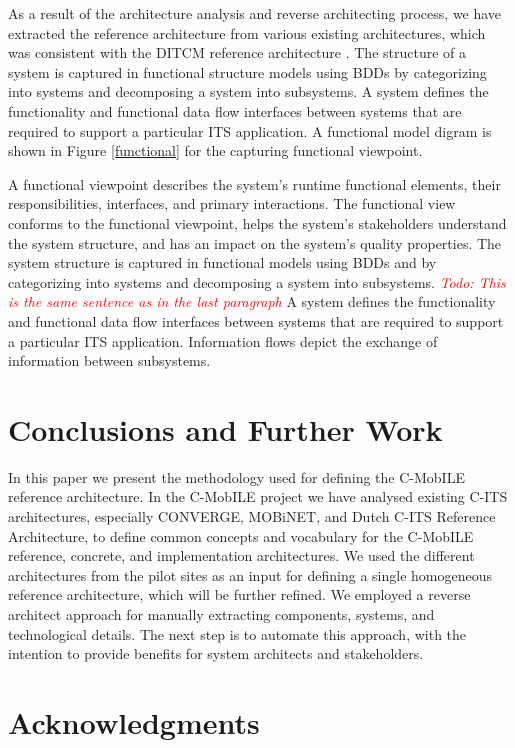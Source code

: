 \documentclass[conference]{IEEEtran}
\newcommand{\todo}[1]{\textcolor{red}{\emph{Todo: #1}}}
\begin{document}
As a result of the architecture analysis and reverse architecting process, we have extracted the reference architecture from various existing architectures, which was consistent with the DITCM reference architecture \cite{ditcm}\cite{ditcmits}.
The structure of a system is captured in functional structure models using BDDs by categorizing into systems and decomposing a system into subsystems.
A system defines the functionality and functional data flow interfaces between systems that are required to support a particular ITS application.
A functional model digram is shown in Figure \ref{functional} for the capturing functional viewpoint.



A functional viewpoint describes the system's runtime functional elements, their responsibilities, interfaces, and primary interactions.
The functional view conforms to the functional viewpoint, helps the system's stakeholders understand the system structure, and has an impact on the system's quality properties.
The system structure is captured in functional models using BDDs and by categorizing into systems and decomposing a system into subsystems. \todo{This is the same sentence as in the last paragraph}
A system defines the functionality and functional data flow interfaces between systems that are required to support a particular ITS application.
Information flows depict the exchange of information between subsystems.


\section{Conclusions and Further Work}

In this paper we present the methodology used for defining the C-MobILE reference architecture.
In the C-MobILE project we have analysed existing C-ITS architectures, especially CONVERGE, MOBiNET, and Dutch C-ITS Reference Architecture, to define common concepts and vocabulary for the C-MobILE reference, concrete, and implementation architectures.
We used the different architectures from the pilot sites as an input for defining a single homogeneous reference architecture, which will be further refined.
We employed a reverse architect approach for manually extracting components, systems, and technological details.
The next step is to automate this approach, with the intention to provide benefits for system architects and stakeholders.


\section*{Acknowledgments}
\end{document}
